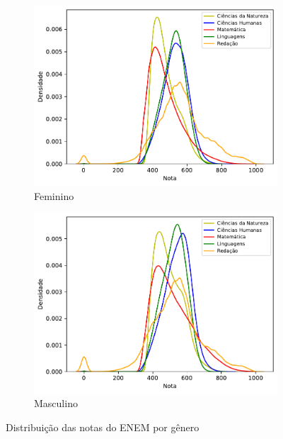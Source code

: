             \begin{figure}[h]
                \centering
            
                \begin{subfigure}{\textwidth}
                    \centering
                    \includegraphics[width=\linewidth]{figuras/distribuicao_notas_feminino.pdf}
                    \caption{Feminino}
                \end{subfigure}
                \hfill
                \begin{subfigure}{\textwidth}
                    \centering
                    \includegraphics[width=\linewidth]{figuras/distribuicao_notas_masculino.pdf}
                    \caption{Masculino}
                \end{subfigure}
            
                \caption{Distribuição das notas do ENEM por gênero}
                \label{fig:nota-genero}
            \end{figure}
            
